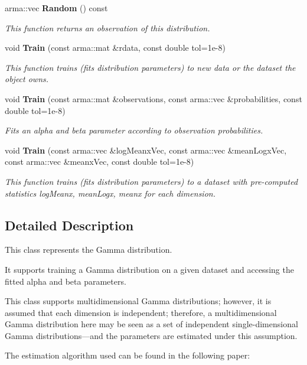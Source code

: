 \begin{DoxyCompactItemize}
arma\+::vec \textbf{ Random} () const
\begin{DoxyCompactList}\small\item\em This function returns an observation of this distribution. \end{DoxyCompactList}\item 
void \textbf{ Train} (const arma\+::mat \&rdata, const double tol=1e-\/8)
\begin{DoxyCompactList}\small\item\em This function trains (fits distribution parameters) to new data or the dataset the object owns. \end{DoxyCompactList}\item 
void \textbf{ Train} (const arma\+::mat \&observations, const arma\+::vec \&probabilities, const double tol=1e-\/8)
\begin{DoxyCompactList}\small\item\em Fits an alpha and beta parameter according to observation probabilities. \end{DoxyCompactList}\item 
void \textbf{ Train} (const arma\+::vec \&log\+Meanx\+Vec, const arma\+::vec \&mean\+Logx\+Vec, const arma\+::vec \&meanx\+Vec, const double tol=1e-\/8)
\begin{DoxyCompactList}\small\item\em This function trains (fits distribution parameters) to a dataset with pre-\/computed statistics log\+Meanx, mean\+Logx, meanx for each dimension. \end{DoxyCompactList}\end{DoxyCompactItemize}


\subsection{Detailed Description}
This class represents the Gamma distribution. 

It supports training a Gamma distribution on a given dataset and accessing the fitted alpha and beta parameters.

This class supports multidimensional Gamma distributions; however, it is assumed that each dimension is independent; therefore, a multidimensional Gamma distribution here may be seen as a set of independent single-\/dimensional Gamma distributions---and the parameters are estimated under this assumption.

The estimation algorithm used can be found in the following paper\+:


